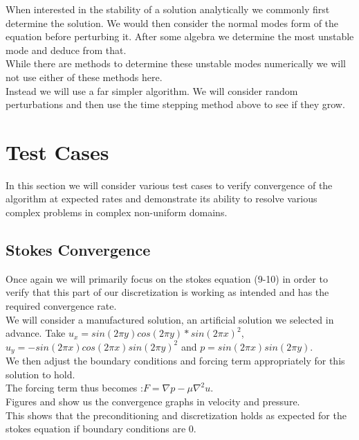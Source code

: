 \documentclass[11pt,twoside,a4paper]{article}
\begin{document}
When interested in the stability of a solution analytically we commonly first determine the solution. We would then consider the normal modes form of the equation before perturbing it. After some algebra we determine the most unstable mode and deduce from that.\\
While there are methods to determine these unstable modes numerically we will not use either of these methods here.\\
Instead we will use a far simpler algorithm.
We will consider random perturbations and then use the time stepping method above to see if they grow.

\section{Test Cases}
In this section we will consider various test cases to verify convergence of the algorithm at expected rates and demonstrate its ability to resolve various complex problems in complex non-uniform domains.
\subsection{Stokes Convergence}

Once again we will primarily focus on the stokes equation (9-10) in order to verify that this part of our discretization is working as intended and has the required convergence rate.\\
We will consider a manufactured solution, an artificial solution we selected in advance. Take $u_x = sin(2 \pi y) cos(2 \pi y)*sin(2 \pi x)^2$, $u_y= -sin(2 \pi x) cos(2 \pi x) sin(2 \pi y)^2$ and $p = sin(2 \pi x) sin(2 \pi y)$.\\
We then adjust the boundary conditions and forcing term appropriately for this solution to hold.\\
 The forcing term thus becomes :$F = \nabla p - \mu \nabla^2 u$.\\
Figures and show us the convergence graphs in velocity and pressure.\\
This shows that the preconditioning and discretization holds as expected for the stokes equation if boundary conditions are $0$.
\\
\end{document}
